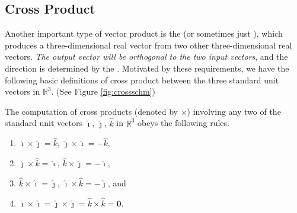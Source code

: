 \subsection{Cross Product}
\label{section:crossprod}
Another important type of vector product is the  (or sometimes just ), which produces a three-dimensional real vector from two other three-dimensional real vectors. \textit{The output vector will be orthogonal to the two input vectors}, and the direction is determined by the . Motivated by these requirements, we have the following basic definitions of cross product between the three standard unit vectors in $\mathbb{R}^3$. (See Figure \ref{fig:crossschm})
\begin{defn}
\label{defn:crossijk}
The computation of cross products (denoted by $\times$) involving any two of the standard unit vectors $\hat{\imath}$, $\hat{\jmath}$, $\hat{k}$ in $\mathbb{R}^3$ obeys the following rules.
\begin{enumerate}
\item $\hat{\imath} \times \hat{\jmath} = \hat{k}$, $\hat{\jmath} \times \hat{\imath} = -\hat{k}$,
\item $\hat{\jmath} \times \hat{k} = \hat{\imath}$, $\hat{k} \times \hat{\jmath} = -\hat{\imath}$,
\item $\hat{k} \times \hat{\imath} = \hat{\jmath}$, $\hat{\imath} \times \hat{k} = -\hat{\jmath}$, and
\item $\hat{\imath} \times \hat{\imath} = \hat{\jmath} \times \hat{\jmath} = \hat{k} \times \hat{k} = \textbf{0}$.
\end{enumerate}
\end{defn}
